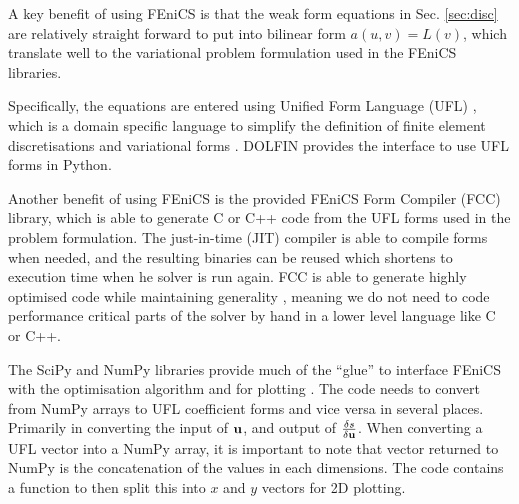 \documentclass[a4paper, 12pt]{article}
\begin{document}


A key benefit of using FEniCS is that the weak form equations in
Sec. \ref{sec:disc} are relatively straight forward to put into bilinear form
$a(u,v) = L(v)$, which translate well to the variational problem formulation
used in the FEniCS libraries.

Specifically, the equations are entered using Unified Form Language (UFL) \cite{ufl}, which
is a domain specific language to simplify the definition of finite element
discretisations and variational forms \cite{alnaes2009unified}. DOLFIN provides
the interface to use UFL forms in Python.

Another benefit of using FEniCS is the provided FEniCS Form Compiler (FCC)
\cite{fcc} library, which is able to generate C or C++ code from the UFL forms
used in the problem formulation. The just-in-time (JIT) compiler is able to
compile forms when needed, and the resulting binaries can be reused which
shortens to execution time when he solver is run again. FCC is able to generate
highly optimised code while maintaining generality \cite{logg2007automated},
meaning we do not need to code performance critical parts of the solver by hand
in a lower level language like C or C++.

The SciPy and NumPy \cite{scipy} libraries provide much of the ``glue'' to
interface FEniCS with the optimisation algorithm and for plotting \cite{hunter2007matplotlib}. The code needs to convert from NumPy arrays to UFL coefficient forms and vice
versa in several places. Primarily in converting the input of $\mathbf{u}$, and
output of $\frac{\delta s}{\delta \mathbf{u}}$. When converting a UFL vector into a NumPy array, it
is important to note that vector returned to NumPy is the concatenation of the
values in each dimensions. The code contains a function to then split this into
$x$ and $y$ vectors for 2D plotting.
\end{document}
